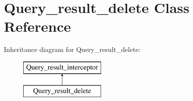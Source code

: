 \hypertarget{classQuery__result__delete}{}\section{Query\+\_\+result\+\_\+delete Class Reference}
\label{classQuery__result__delete}
Inheritance diagram for Query\+\_\+result\+\_\+delete\+:\begin{figure}[H]
\begin{center}
\leavevmode
\includegraphics[height=2.000000cm]{classQuery__result__delete}
\end{center}
\end{figure}
